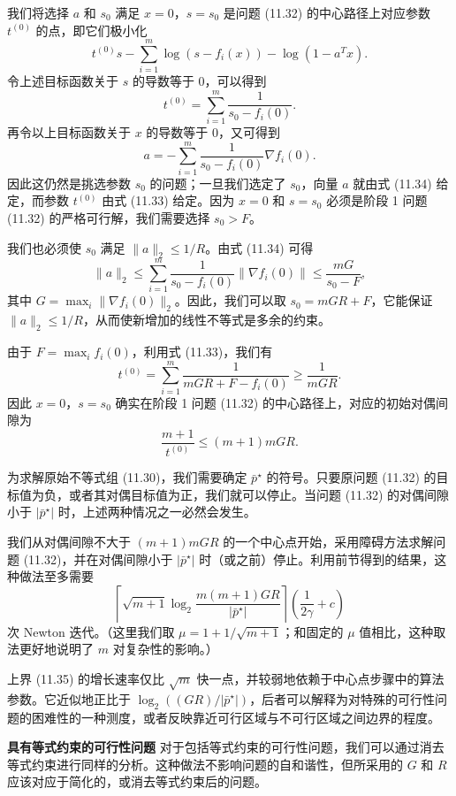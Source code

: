 \documentclass[UTF8, 12pt, fontset=fandol, oneside]{ctexart}
\begin{document}
我们将选择 $a$ 和 $s_0$ 满足 $x=0$，$s=s_0$ 是问题 (11.32) 的中心路径上对应参数 $t^{(0)}$ 的点，即它们极小化
\[
t^{(0)}s-\sum_{i=1}^m\log(s-f_i(x))-\log(1-a^Tx).
\]
令上述目标函数关于 $s$ 的导数等于 0，可以得到
\begin{equation}
t^{(0)}=\sum_{i=1}^m\frac{1}{s_0-f_i(0)}.
\tag{11.33}
\end{equation}
再令以上目标函数关于 $x$ 的导数等于 0，又可得到
\begin{equation}
a=-\sum_{i=1}^m\frac{1}{s_0-f_i(0)}\nabla f_i(0).
\tag{11.34}
\end{equation}
因此这仍然是挑选参数 $s_0$ 的问题；一旦我们选定了 $s_0$，向量 $a$ 就由式 (11.34) 给定，而参数 $t^{(0)}$ 由式 (11.33) 给定。因为 $x=0$ 和 $s=s_0$ 必须是阶段 1 问题 (11.32) 的严格可行解，我们需要选择 $s_0>F$。

我们也必须使 $s_0$ 满足 $\|a\|_2\leq 1/R$。由式 (11.34) 可得
\[
\|a\|_2\leq \sum_{i=1}^m\frac{1}{s_0-f_i(0)}\|\nabla f_i(0)\|\leq \frac{mG}{s_0-F},
\]
其中 $G=\max_i\|\nabla f_i(0)\|_2$。因此，我们可以取 $s_0=mGR+F$，它能保证 $\|a\|_2\leq 1/R$，从而使新增加的线性不等式是多余的约束。

由于 $F=\max_i f_i(0)$，利用式 (11.33)，我们有
\[
t^{(0)}=\sum_{i=1}^m\frac{1}{mGR+F-f_i(0)}\geq \frac{1}{mGR}.
\]
因此 $x=0$，$s=s_0$ 确实在阶段 1 问题 (11.32) 的中心路径上，对应的初始对偶间隙为
\[
\frac{m+1}{t^{(0)}}\leq (m+1)mGR.
\]

为求解原始不等式组 (11.30)，我们需要确定 $\bar{p}^\star$ 的符号。只要原问题 (11.32) 的目标值为负，或者其对偶目标值为正，我们就可以停止。当问题 (11.32) 的对偶间隙小于 $|\bar{p}^\star|$ 时，上述两种情况之一必然会发生。

我们从对偶间隙不大于 $(m+1)mGR$ 的一个中心点开始，采用障碍方法求解问题 (11.32)，并在对偶间隙小于 $|\bar{p}^\star|$ 时（或之前）停止。利用前节得到的结果，这种做法至多需要
\begin{equation}
\left\lceil\sqrt{m+1}\log_2\frac{m(m+1)GR}{|\bar{p}^\star|}\right\rceil
\left(\frac{1}{2\gamma}+c\right)
\tag{11.35}
\end{equation}
次 Newton 迭代。（这里我们取 $\mu=1+1/\sqrt{m+1}$；和固定的 $\mu$ 值相比，这种取法更好地说明了 $m$ 对复杂性的影响。）

上界 (11.35) 的增长速率仅比 $\sqrt{m}$ 快一点，并较弱地依赖于中心点步骤中的算法参数。它近似地正比于 $\log_2((GR)/|\bar{p}^\star|)$，后者可以解释为对特殊的可行性问题的困难性的一种测度，或者反映靠近可行区域与不可行区域之间边界的程度。

\noindent\textbf{具有等式约束的可行性问题}\quad
对于包括等式约束的可行性问题，我们可以通过消去等式约束进行同样的分析。这种做法不影响问题的自和谐性，但所采用的 $G$ 和 $R$ 应该对应于简化的，或消去等式约束后的问题。
\end{document}
